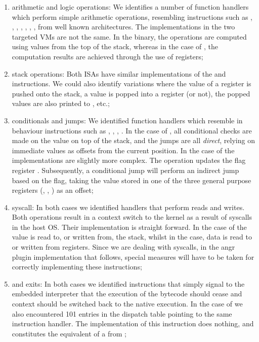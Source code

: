 \begin{enumerate}
    \item arithmetic and logic operations: We identifies a number of function handlers which perform simple arithmetic operations, resembling instructions such as , , , , , , , from well known architectures. The implementations in the two targeted \glspl{VM} are not the same. In the  binary, the operations are computed using values from the top of the stack, whereas in the case of , the computation results are achieved through the use of registers;
    \item stack operations: Both \glspl{ISA} have similar implementations of the  and  instructions. We could also identify variations where the value of a register is pushed onto the stack, a value is popped into a register (or not), the popped values are also printed to , etc.;
    \item conditionals and jumps: We identified function handlers which resemble in behaviour instructions such as , , , . In the case of , all conditional checks are made on the value on top of the stack, and the jumps are all \emph{direct}, relying on immediate values as offsets from the current position. In the case of  the implementations are slightly more complex. The  operation updates the flag register . Subsequently, a conditional jump will perform an indirect jump based on the  flag, taking the value stored in one of the three general purpose registers (, , ) as an offset;
    \item \gls{syscall}: In both cases we identified handlers that perform reads and writes. Both operations result in a context switch to the kernel as a result of \glspl{syscall} in the host \gls{OS}. Their implementation is straight forward. In the case of  the value is read to, or written from, the stack, whilst in the  case, data is read to or written from registers. Since we are dealing with \glspl{syscall}, in the angr plugin implementation that follows, special measures will have to be taken for correctly implementing these instructions;
    \item {} and exits: In both cases we identified  instructions that simply signal to the embedded interpreter that the execution of the bytecode should cease and context should be switched back to the native execution. In the case of  we also encountered 101 entries in the dispatch table pointing to the same instruction handler. The implementation of this instruction does nothing, and constitutes the equivalent of a  from ;

\end{enumerate}
